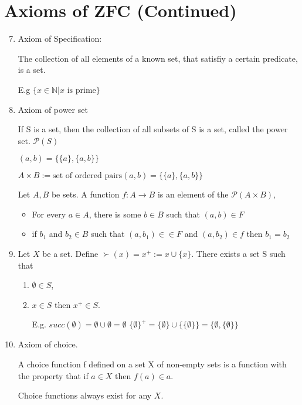 \documentclass[twoside]{article}
\newcommand{\N}{\mathbb{N}}
\begin{document}

\section{Axioms of ZFC (Continued)}

\begin{enumerate}
    \setcounter{enumi}{6}
    \item Axiom of Specification:

          The collection of all elements of a known set, that satisfiy a certain predicate, is a set.

          E.g $\{x \in \N \vert x \text{ is prime}\}$

    \item Axiom of power set

          If S is a set, then the collection of all subsets of S is a set, called the power set. $\mathcal P (S)$

          $(a,b) = \{\{a\}, \{a, b\}\}$

          $A \times B := \text{set of ordered pairs} (a,b) = \{\{a\}, \{a, b\}\}$

          Let $A,B$ be sets. A function $f : A \rightarrow B$ is an element of the $\mathcal{P} (A \times B)$,

          \begin{itemize}
              \item For every $a \in A$, there is some $b \in B$ such that $(a,b) \in F$

              \item if $b_1$ and $b_2 \in B$ such that $(a,b_1) \in \in F$ and $(a, b_2) \in f$ then $b_1 = b_2$
          \end{itemize}

    \item Let $X$ be a set. Define $\succ(x) = x^{+} := x \cup \{x\}$.
          There exists a set S such that
          \begin{enumerate}
              \item $\emptyset \in S$,
              \item $x \in S$ then $x^{+} \in S$.

                    E.g. $succ(\emptyset) = \emptyset \cup {\emptyset} = {\emptyset}$
                    $\{\emptyset\}^{+} = \{\emptyset\} \cup \{\{\emptyset\}\} = \{\emptyset, \{\emptyset\}\}$
          \end{enumerate}

    \item Axiom of choice.

          A choice function f defined on a set X of non-empty sets is a function with the property that if $a \in X$ then $f(a) \in a$.

          Choice functions always exist for any $X$.
\end{enumerate}
\end{document}
